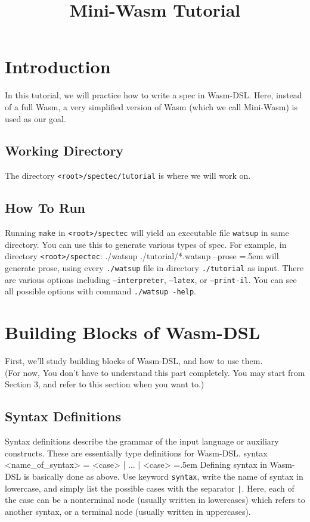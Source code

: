 \documentclass{article}
\date{}
\newenvironment{lcverbatim}
 {\SaveVerbatim{cverb}}
 {\endSaveVerbatim
  \flushleft\fboxrule=0pt\fboxsep=.5em
  \colorbox{cverbbg}{%
    \makebox[\dimexpr\linewidth-2\fboxsep][l]{\BUseVerbatim{cverb}}%
  }
  \endflushleft
}
\newcommand\K[1]{\texttt{#1}}
\begin{document}
\title{Mini-Wasm Tutorial}
\maketitle

\section{Introduction}
In this tutorial, we will practice how to write a spec in Wasm-DSL.
Here, instead of a full Wasm, a very simplified version of Wasm (which we call Mini-Wasm) is used as our goal.

\subsection{Working Directory}
The directory \K{<root>/spectec/tutorial} is where we will work on.

\subsection{How To Run}
Running \K{make} in \K{<root>/spectec} will yield an executable file \K{watsup} in same directory. You can use this to generate various types of spec. For example, in directory \K{<root>/spectec}:
\begin{lcverbatim}
./watsup ./tutorial/*.watsup --prose
\end{lcverbatim}
will generate prose, using every \K{./watsup} file in directory \K{./tutorial} as input. There are various options including \K{--interpreter}, \K{--latex}, or \K{--print-il}. You can see all possible options with command \K{./watsup -help}.

\section{Building Blocks of Wasm-DSL}
First, we'll study building blocks of Wasm-DSL, and how to use them. \\
(For now, You don't have to understand this part completely. You may start from Section 3, and refer to this section when you want to.)

\subsection{Syntax Definitions}
Syntax definitions describe the grammar of the input language or auxiliary constructs. These are essentially type definitions for Wasm-DSL.
\begin{lcverbatim}
syntax <name_of_syntax> = <case> | ... | <case>
\end{lcverbatim}
Defining syntax in Wasm-DSL is basically done as above. Use keyword \K{syntax}, write the name of syntax in lowercase, and simply list the possible cases with the separator \K{|}. Here, each of the case can be a nonterminal node (usually written in lowercases) which refers to another syntax, or a terminal node (usually written in uppercases).
\end{document}
